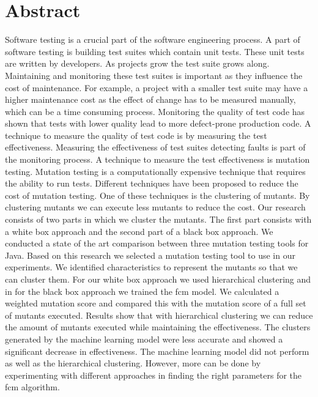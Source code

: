 \documentclass[../main]{subfiles}
\begin{document}
\chapter*{Abstract}
Software testing is a crucial part of the software engineering process. 
A part of software testing is building test suites which contain unit tests.
These unit tests are written by developers. 
As projects grow the test suite grows along.
Maintaining and monitoring these test suites is important as they influence the cost of maintenance.
For example, a project with a smaller test suite may have a higher maintenance cost as the effect of change has to be measured manually, which can be a time consuming process.
Monitoring the quality of test code has shown that tests with lower quality lead to more defect-prone production code.
A technique to measure the quality of test code is by measuring the test effectiveness.
\newline
Measuring the effectiveness of test suites detecting faults is part of the monitoring process.
A technique to measure the test effectiveness is mutation testing.
Mutation testing is a computationally expensive technique that requires the ability to run tests.
Different techniques have been proposed to reduce the cost of mutation testing.
One of these techniques is the clustering of mutants.
By clustering mutants we can execute less mutants to reduce the cost.
\newline
Our research consists of two parts in which we cluster the mutants.
The first part consists with a white box approach and the second part of a black box approach.
We conducted a state of the art comparison between three mutation testing tools for Java.
Based on this research we selected a mutation testing tool to use in our experiments.
\newline
We identified characteristics to represent the mutants so that we can cluster them.
For our white box approach we used hierarchical clustering and in for the black box approach we trained the \acrlong{fcm} model.
We calculated a weighted mutation score and compared this with the mutation score of a full set of mutants executed.
Results show that with hierarchical clustering we can reduce the amount of mutants executed while maintaining the effectiveness.
The clusters generated by the machine learning model were less accurate and showed a significant decrease in effectiveness.
The machine learning model did not perform as well as the hierarchical clustering.
However, more can be done by experimenting with different approaches in finding the right parameters for the \acrlong{fcm} algorithm. 
\end{document}
